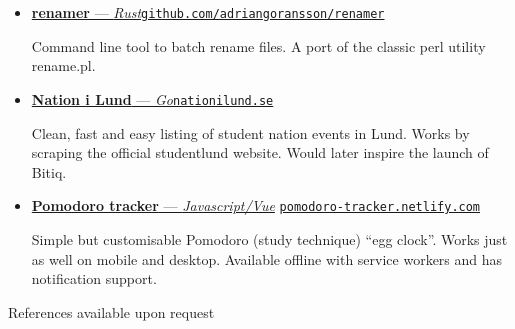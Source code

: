 \documentclass[a4paper]{article}
\newcommand{\shorturl}[1]{\href{https://#1}{\texttt{#1}}}
\begin{document}
    \begin{itemize}
        \item
        \href{https://github.com/adriangoransson/renamer}{\textbf{renamer} --- \textit{Rust}}\hfill \href{https://github.com/adriangoransson/renamer}{\texttt{github.com/adriangoransson/renamer}}

        Command line tool to batch rename files. A port of the classic perl utility rename.pl.

        \item
        \href{https://nationilund.se}{\textbf{Nation i Lund} --- \textit{Go}}\hfill \shorturl{nationilund.se}

        Clean, fast and easy listing of student nation events in Lund. Works by scraping the official studentlund website. Would later inspire the launch of Bitiq.

        \item \href{https://pomodoro-tracker.netlify.com}{\textbf{Pomodoro tracker} --- \textit{Javascript/Vue}} \hfill \shorturl{pomodoro-tracker.netlify.com}

        Simple but customisable Pomodoro (study technique) ``egg clock''. Works just as well on mobile and desktop. Available offline with service workers and has notification support.
    \end{itemize}

\bigskip
\center \large References available upon request
\end{document}
